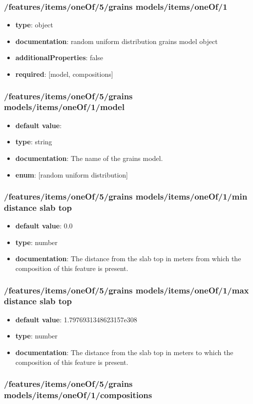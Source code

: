 \subsubsection{/features/items/oneOf/5/grains models/items/oneOf/1}
\begin{itemize}\item {\bf type}: object
\item {\bf documentation}: random uniform distribution grains model object
\item {\bf additionalProperties}: false
\item {\bf required}: [model, compositions]\end{itemize}
\subsubsection{/features/items/oneOf/5/grains models/items/oneOf/1/model}
\begin{itemize}\item {\bf default value}: 
\item {\bf type}: string
\item {\bf documentation}: The name of the grains model.
\item {\bf enum}: [random uniform distribution]\end{itemize}\subsubsection{/features/items/oneOf/5/grains models/items/oneOf/1/min distance slab top}
\begin{itemize}\item {\bf default value}: 0.0
\item {\bf type}: number
\item {\bf documentation}: The distance from the slab top in meters from which the composition of this feature is present.
\end{itemize}\subsubsection{/features/items/oneOf/5/grains models/items/oneOf/1/max distance slab top}
\begin{itemize}\item {\bf default value}: 1.7976931348623157e308
\item {\bf type}: number
\item {\bf documentation}: The distance from the slab top in meters to which the composition of this feature is present.
\end{itemize}\subsubsection{/features/items/oneOf/5/grains models/items/oneOf/1/compositions}
